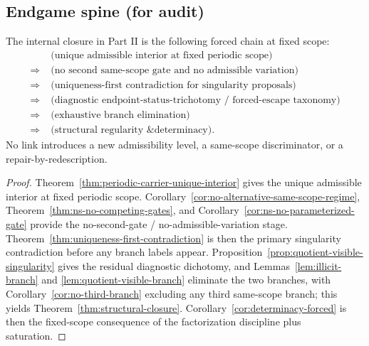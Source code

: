 \subsection{Endgame spine (for audit)}
\begin{proposition}\label{prop:endgame-spine}
The internal closure in Part II is the following forced chain at fixed scope:
\begin{align*}
&\text{(unique admissible interior at fixed periodic scope)}\\
\Longrightarrow\;&\text{(no second same-scope gate and no admissible variation)}\\
\Longrightarrow\;&\text{(uniqueness-first contradiction for singularity proposals)}\\
\Longrightarrow\;&\text{(diagnostic endpoint-status-trichotomy / forced-escape taxonomy)}\\
\Longrightarrow\;&\text{(exhaustive branch elimination)}\\
\Longrightarrow\;&\text{(structural regularity \& determinacy).}
\end{align*}
No link introduces a new admissibility level, a same-scope discriminator, or a repair-by-redescription.
\end{proposition}

\begin{proof}
Theorem~\ref{thm:periodic-carrier-unique-interior} gives the unique admissible interior at fixed periodic scope. Corollary~\ref{cor:no-alternative-same-scope-regime}, Theorem~\ref{thm:ns-no-competing-gates}, and Corollary~\ref{cor:ns-no-parameterized-gate} provide the no-second-gate / no-admissible-variation stage. Theorem~\ref{thm:uniqueness-first-contradiction} is then the primary singularity contradiction before any branch labels appear. Proposition~\ref{prop:quotient-visible-singularity} gives the residual diagnostic dichotomy, and Lemmas~\ref{lem:illicit-branch} and \ref{lem:quotient-visible-branch} eliminate the two branches, with Corollary~\ref{cor:no-third-branch} excluding any third same-scope branch; this yields Theorem~\ref{thm:structural-closure}. Corollary~\ref{cor:determinacy-forced} is then the fixed-scope consequence of the factorization discipline plus saturation.
\end{proof}

